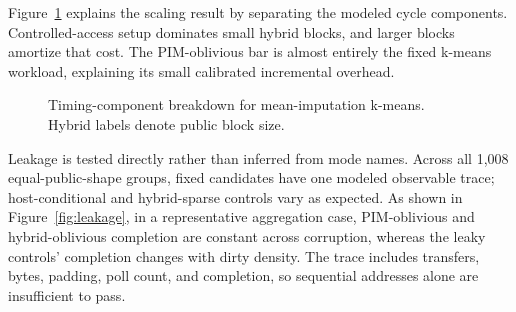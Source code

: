 \documentclass[conference]{IEEEtran}
\begin{document}
Figure~\ref{fig:phase_breakdown} explains the scaling result by separating the
modeled cycle components. Controlled-access setup dominates small hybrid
blocks, and larger blocks amortize that cost. The PIM-oblivious bar is almost
entirely the fixed k-means workload, explaining its small calibrated
incremental overhead.

\begin{figure}[t]
\centering
{}
\caption{Timing-component breakdown for mean-imputation k-means.
Hybrid labels denote public block size.}
\label{fig:phase_breakdown}
\end{figure}

Leakage is tested directly rather than inferred from mode names. Across all
1,008 equal-public-shape groups, fixed candidates have one modeled observable
trace; host-conditional and hybrid-sparse controls vary as expected. As shown in Figure~\ref{fig:leakage}, in a representative aggregation case, PIM-oblivious and hybrid-oblivious completion are constant across corruption, whereas the leaky controls' completion changes
with dirty density. The trace includes transfers, bytes, padding, poll
count, and completion, so sequential addresses alone are insufficient to pass.
\end{document}
